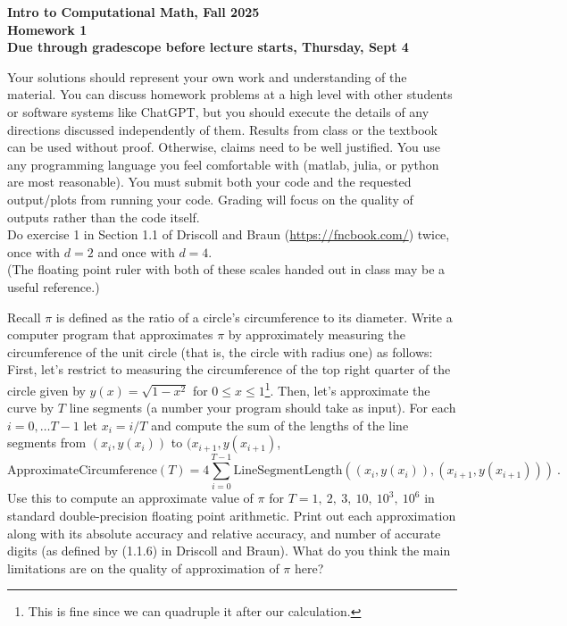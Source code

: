 \documentclass[11pt]{article}
\begin{document}
\begin{center}
{\bf Intro to Computational Math, Fall 2025\\
Homework 1\\
Due through gradescope before lecture starts, Thursday, Sept 4}
\end{center}

Your solutions should represent your own work and understanding of the material. You can discuss homework problems at a high level with other students or software systems like ChatGPT, but you should execute the details of any directions discussed independently of them. Results from class or the textbook can be used without proof. Otherwise, claims need to be well justified. You use any programming language you feel comfortable with (matlab, julia, or python are most reasonable). You must submit both your code and the requested output/plots from running your code. Grading will focus on the quality of outputs rather than the code itself.\\

 Do exercise 1 in Section 1.1 of Driscoll and Braun (\url{https://fncbook.com/}) twice, once with $d=2$ and once with $d=4$.\\
(The floating point ruler with both of these scales handed out in class may be a useful reference.) 

\vskip1cm

 Recall $\pi$ is defined as the ratio of a circle's circumference to its diameter. Write a computer program that approximates $\pi$ by approximately measuring the circumference of the unit circle (that is, the circle with radius one) as follows:
First, let's restrict to measuring the circumference of the top right quarter of the circle given by $y(x) = \sqrt{1-x^2}$ for $0\leq x\leq 1$\footnote{This is fine since we can quadruple it after our calculation.}. Then, let's approximate the curve by $T$ line segments (a number your program should take as input). For each $i=0,\dots T-1$ let $x_i = i/T$ and compute the sum of the lengths of the line segments from $(x_i,y(x_i))$ to $(x_{i+1},y(x_{i+1})$,
$$ \mathrm{ApproximateCircumference}(T) = 4\sum_{i=0}^{T-1} \mathrm{LineSegmentLength}((x_i,y(x_i)),(x_{i+1},y(x_{i+1}))) \ . $$
Use this to compute an approximate value of $\pi$ for $T=1,\ 2,\ 3, \ 10,\ 10^3,\ 10^6$ in standard double-precision floating point arithmetic. Print out each approximation along with its absolute accuracy and relative accuracy, and number of accurate digits (as defined by (1.1.6) in Driscoll and Braun). What do you think the main limitations are on the quality of approximation of $\pi$ here?\\
\end{document}
